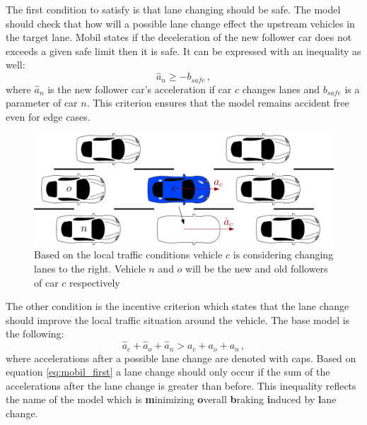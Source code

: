 \documentclass[a4paper,11pt,twoside]{report}
\begin{document}
			The first condition to satisfy is that lane changing should be safe. The model should check that how will a possible lane change effect the upstream vehicles in the target lane. Mobil states if the deceleration of the new follower car does not exceeds a given safe limit then it is safe. It can be expressed with an inequality as well:
			\begin{equation}
				\hat{a}_n\geq -b_{safe}\,,
			\end{equation}
			where $\hat{a}_n$ is the new follower car's acceleration if car $c$ changes lanes and $b_{safe}$ is a parameter of car $n$. This criterion ensures that the model remains accident free even for edge cases.
			\begin{figure}[h]
				\centering
				\includegraphics[width=\textwidth]{mobil.eps}
				\caption{Based on the local traffic conditions vehicle $c$ is considering changing lanes  to the right. Vehicle $n$ and $o$ will be the new and old followers of car $c$ respectively}
				\label{fig:mobil}
			\end{figure}
			The other condition is the incentive criterion which states that the lane change should improve the local traffic situation around the vehicle.  The base model is the following:
			\begin{equation}
				\hat{a}_c + \hat{a}_o + \hat{a}_n > a_c + a_o + a_n\,,
				\label{eq:mobil_first}
			\end{equation}
			where accelerations after a possible lane change are denoted with caps.
			Based on equation \ref{eq:mobil_first} a lane change should only occur if the sum of the accelerations after the lane change is greater than before. This inequality reflects the name of the model which is \textbf{m}inimizing \textbf{o}verall \textbf{b}raking \textbf{i}nduced by \textbf{l}ane change.
\end{document}
